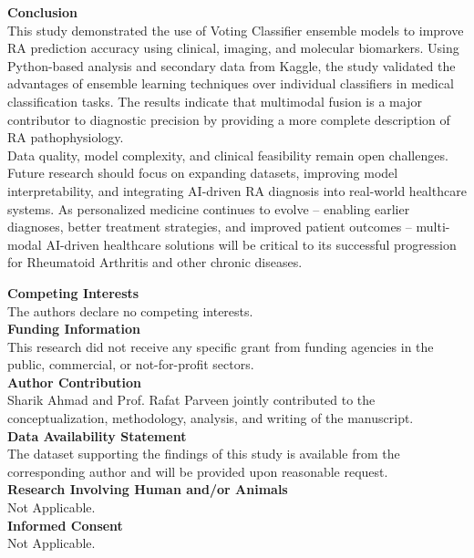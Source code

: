 \documentclass[10pt]{NSP1}
\begin{document}
	\textbf{Conclusion}\\
	This study demonstrated the use of Voting Classifier ensemble models to improve RA prediction accuracy using clinical, imaging, and molecular biomarkers. Using Python-based analysis and secondary data from Kaggle, the study validated the advantages of ensemble learning techniques over individual classifiers in medical classification tasks. The results indicate that multimodal fusion is a major contributor to diagnostic precision by providing a more complete description of RA pathophysiology.\\
	Data quality, model complexity, and clinical feasibility remain open challenges. Future research should focus on expanding datasets, improving model interpretability, and integrating AI-driven RA diagnosis into real-world healthcare systems. As personalized medicine continues to evolve -- enabling earlier diagnoses, better treatment strategies, and improved patient outcomes -- multi-modal AI-driven healthcare solutions will be critical to its successful progression for Rheumatoid Arthritis and other chronic diseases.
	
	\textbf{Competing Interests}\\
	The authors declare no competing interests.\\
	\textbf{Funding Information}\\
	This research did not receive any specific grant from funding agencies in the public, commercial, or not-for-profit sectors.\\
	\textbf{Author Contribution}\\
	Sharik Ahmad and Prof. Rafat Parveen jointly contributed to the conceptualization, methodology, analysis, and writing of the manuscript.\\
	\textbf{Data Availability Statement}\\
	The dataset supporting the findings of this study is available from the corresponding author and will be provided upon reasonable request.\\
	\textbf{Research Involving Human and/or Animals}\\
	Not Applicable.\\
	\textbf{Informed Consent}\\
	Not Applicable.
	
	
	
	
\end{document}
